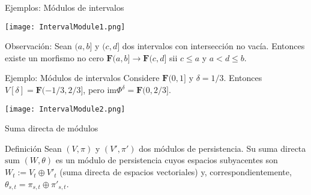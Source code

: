 \documentclass{beamer}
\begin{document}
\begin{frame}{Ejemplos: Módulos de intervalos}

\centerline{
\texttt{[image: IntervalModule1.png]}
}
\pause

\begin{block}{Observación:}
Sean $(a,b]$ y $(c,d]$ dos intervalos con intersección no vacía. Entonces existe un morfismo no cero $\mathbf{F}(a,b]\rightarrow\mathbf{F}(c,d]$ sii $c\leq a$ y $a<d\leq b$. 
\end{block}
    
\end{frame}

\begin{frame}{Ejemplo: Módulos de intervalos}
Considere $\mathbf{F}(0,1]$ y $\delta=1/3$. Entonces $V[\delta]=\mathbf{F}(-1/3,2/3]$, pero $\text{im} \Phi^{\delta}=\mathbf{F}(0,2/3]$.

\pause
\centerline{
\texttt{[image: IntervalModule2.png]}
}

\end{frame}

\begin{frame}{Suma directa de módulos}

\begin{block}{Definición}
Sean $(V,\pi)$ y $(V',\pi')$ dos módulos de persistencia.
Su suma directa $\text{sum }(W,\theta)$ es un módulo de persistencia cuyos espacios subyacentes son $W_t:=V_t\oplus V'_t$ (suma directa de espacios vectoriales) y, correspondientemente, $\theta_{s,t}=\pi_{s,t}\oplus \pi'_{s,t}$.
    
\end{block}
    
\end{frame}
\end{document}
